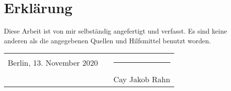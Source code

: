 \clearpage
\chapter*{Erklärung}\label{erklaerung}
\thispagestyle{empty}

Diese Arbeit ist von mir selbständig angefertigt und verfasst. Es sind keine anderen als die angegebenen Quellen und Hilfsmittel benutzt worden.

     
\vspace{1cm}

\begin{tabularx}{\textwidth}{lXl}
  Berlin, 13. November 2020 & & \rule{5cm}{0.4pt}\\
  							& & Cay Jakob Rahn
\end{tabularx}
